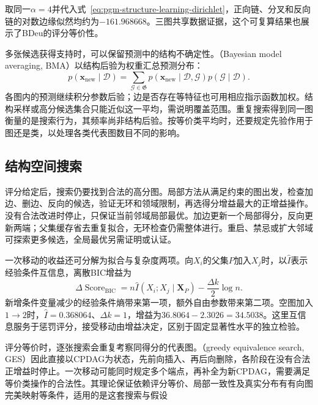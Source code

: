 取同一$\alpha=4$并代入式~\eqref{eq:pgm-structure-learning-dirichlet}，正向链、分叉和反向链的对数边缘似然均约为$-161.968668$。三图共享数据证据，这个可复算结果也展示了BDeu的评分等价性。

多张候选获得支持时，可以保留预测中的结构不确定性。（Bayesian model averaging, BMA）以结构后验为权重汇总预测分布：
\[
  p(\bm{x}_{\mathrm{new}}\mid\mathcal{D})
  =\sum_{\mathcal{G}\in\mathfrak{G}}
    p(\bm{x}_{\mathrm{new}}\mid\mathcal{D},\mathcal{G})
    p(\mathcal{G}\mid\mathcal{D}).
\]
各图内的预测继续积分参数后验；边是否存在等特征也可用相应指示函数加权。结构采样或高分候选集合只能近似这一平均，需说明覆盖范围。重复搜索得到同一图衡量的是搜索行为，其频率尚非结构后验。按等价类平均时，还要规定先验作用于图还是类，以处理各类代表图数目不同的影响。

\subsection{结构空间搜索}
\label{sec:pgm-structure-learning-search}

评分给定后，搜索仍要找到合法的高分图。局部方法从满足约束的图出发，检查加边、删边、反向的候选，验证无环和领域限制，再选得分增益最大的正增益操作。没有合法改进时停止，只保证当前邻域局部最优。加边更新一个局部得分，反向更新两端；父集缓存省去重复拟合，无环检查仍需整体进行。重启、禁忌或扩大邻域可探索更多候选，全局最优另需证明或认证。

一次移动的收益还可分解为拟合与复杂度两项。向$X_i$的父集$P$加入$X_j$时，以$\widehat I$表示经验条件互信息，离散BIC增益为
\begin{equation}
  \Delta\operatorname{Score}_{\mathrm{BIC}}
  =n\widehat I(X_i;X_j\mid\bm{X}_P)
   -\frac{\Delta k}{2}\log n.
  \label{eq:pgm-structure-learning-score-gain}
\end{equation}
新增条件变量减少的经验条件熵带来第一项，额外自由参数带来第二项。空图加入$1\to2$时，$\widehat I=0.368064$、$\Delta k=1$，增益为$36.8064-2.3026=34.5038$。这里互信息服务于惩罚评分，接受移动由增益决定，区别于固定显著性水平的独立检验。

评分等价时，逐张搜索会重复考察同得分的代表图。（greedy equivalence search, GES）因此直接以CPDAG为状态，先前向插入、再后向删除，各阶段在没有合法正增益时停止。一次移动可能同时规定多个端点，再补全为新CPDAG，需要满足等价类操作的合法性。其理论保证依赖评分等价、局部一致性及真实分布有有向图完美映射等条件，适用的是这套搜索与假设

